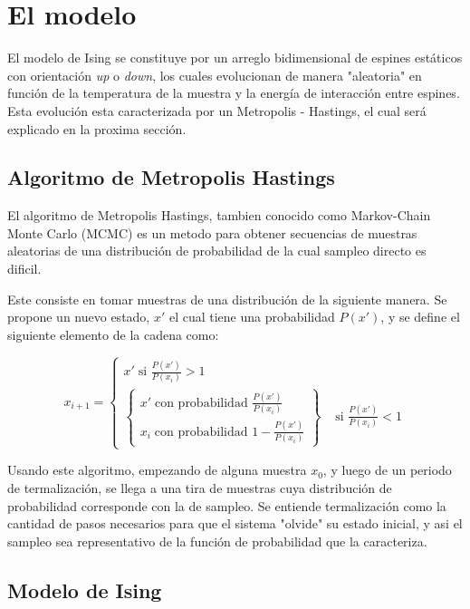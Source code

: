 \documentclass[%
 reprint,
 amsmath,amssymb,
 aps,
]{revtex4-1}
\begin{document}
\section{El modelo}

El modelo de Ising se constituye por un arreglo bidimensional de espines
est\'aticos con orientaci\'on \textit{up} o \textit{down}, los cuales
evolucionan de manera "aleatoria" en funci\'on de la temperatura de la muestra
y la energ\'ia de interacci\'on entre espines. Esta evoluci\'on esta
caracterizada por un Metropolis - Hastings, el cual ser\'a explicado en la
proxima secci\'on.

\subsection{Algoritmo de Metropolis Hastings}

El algoritmo de Metropolis Hastings, tambien conocido como Markov-Chain
Monte Carlo (MCMC) es un metodo para obtener secuencias de muestras aleatorias
de una distribuci\'on de probabilidad de la cual sampleo directo es dificil.

Este consiste en tomar muestras de una distribuci\'on de la siguiente manera.
Se propone un nuevo estado, $x'$ el cual tiene una probabilidad $P(x')$, y se
define el siguiente elemento de la cadena como:

$$
x_{i + 1} = \left \{
\begin{matrix}
  x' \; \text{si } \frac{P(x')}{P(x_i)} > 1 \\
  \left \{ \begin{matrix}
    x' \; \text{con probabilidad }\frac{P(x')}{P(x_i)} \\
    x_i \; \text{con probabilidad }1 - \frac{P(x')}{P(x_i)}
\end{matrix}
  \right \}
 \;\;\;\; \text{si } \frac{P(x')}{P(x_i)} < 1
\end{matrix}   \right.
$$

Usando este algoritmo, empezando de alguna muestra $x_0$, y luego de un periodo
de termalizaci\'on, se llega a una tira de muestras cuya distribuci\'on de
probabilidad corresponde con la de sampleo. Se entiende termalizaci\'on como la
cantidad de pasos necesarios para que el sistema "olvide" su estado inicial, y
asi el sampleo sea representativo de la funci\'on de probabilidad que la caracteriza.

\subsection{Modelo de Ising}
\end{document}
